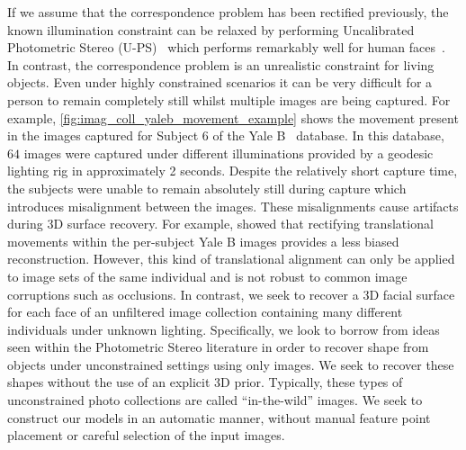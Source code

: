 If we assume that the correspondence problem has been rectified previously,
the known illumination constraint can be relaxed by performing
Uncalibrated Photometric Stereo (U-PS)~\cite{hayakawa1994photometric,%
basri2007photometric} which performs remarkably well for
human faces~\cite{KemelmacherShlizerman:2013iv,kemelmacher2011face,%
kemelmacher2012collection}. In contrast, the correspondence problem is an
unrealistic constraint for living objects. Even under highly constrained
scenarios it can be very difficult for a person to remain completely still
whilst multiple images are being captured.
For example, \cref{fig:imag_coll_yaleb_movement_example} shows the movement
present in the images captured for Subject 6 of the
Yale B~\cite{georghiades2001fromfew} database. In this database, $64$ images
were captured under different illuminations provided by a geodesic lighting rig in
approximately 2 seconds. Despite the relatively short capture time, the subjects
were unable to remain absolutely still during capture which introduces
misalignment between the images. These misalignments cause artifacts
during 3D surface recovery.
For example, \citet{harrison2012translational} showed that rectifying
translational movements within the per-subject Yale B images provides a less
biased reconstruction. However, this kind of translational alignment can only
be applied to image sets of the same individual and is not robust to common
image corruptions such as occlusions. In contrast, we seek to recover a 3D
facial surface for each face of an unfiltered image collection containing
many different individuals under unknown lighting.
Specifically, we look to borrow from ideas seen within the Photometric Stereo
literature in order to recover shape from objects under unconstrained settings
using only images. We seek to recover these shapes without the use of an explicit
3D prior. Typically, these types of unconstrained
photo collections are called ``in-the-wild'' images. We seek to construct our
models in an automatic manner, without manual feature point placement or
careful selection of the input images.
